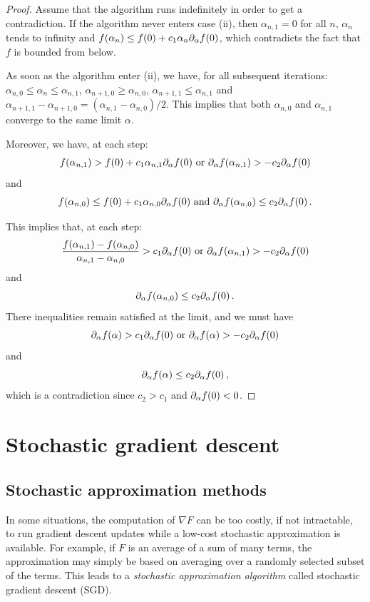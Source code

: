 \begin{proof}
Assume that the algorithm runs indefinitely in order to get a contradiction.
If the algorithm never enters case (ii), then $\alpha_{n,1} = 0$ for all $n$, $\alpha_n$ tends to infinity and $f(\alpha_n) \leq  f(0) + c_1\alpha_n \partial_\alpha f(0)$, which contradicts the fact that $f$ is bounded from below. 

As soon as the algorithm enter (ii), we have, for all subsequent iterations:
$\alpha_{n,0}\leq \alpha_n\leq \alpha_{n,1}$, $\alpha_{n+1, 0}\geq \alpha_{n,0}$, $\alpha_{n+1, 1}\leq \alpha_{n,1}$ and $\alpha_{n+1,1} - \alpha_{n+1,0} = (\alpha_{n,1} - \alpha_{n,0})/2$. This implies that both $\alpha_{n,0}$ and $\alpha_{n,1}$ converge to the same limit $\alpha$.

Moreover, we have, at each step:
\[
f(\alpha_{n,1}) >  f(0) + c_1\alpha_{n,1} \partial_\alpha f(0) \text{ or }
\partial_\alpha f(\alpha_{n,1}) > - c_2 \partial_\alpha f(0)
\]
and
\[
f(\alpha_{n,0}) \leq  f(0) + c_1\alpha_{n,0} \partial_\alpha f(0) \text{ and }
\partial_\alpha f(\alpha_{n,0}) \leq c_2 \partial_\alpha f(0)\,.
\]

This implies that, at each step:
\[
\frac{f(\alpha_{n,1}) - f(\alpha_{n,0})}{\alpha_{n,1} - \alpha_{n,0}} > c_1 \partial_\alpha f(0) \text{ or }
\partial_\alpha f(\alpha_{n,1}) > - c_2 \partial_\alpha f(0)
\]
and
\[
\partial_\alpha f(\alpha_{n,0}) \leq c_2 \partial_\alpha f(0)\,.
\]
There inequalities remain satisfied at the limit, and we must have
\[
\partial_\alpha f(\alpha)  > c_1 \partial_\alpha f(0) \text{ or }
\partial_\alpha f(\alpha) > - c_2 \partial_\alpha f(0)
\]
and
\[
\partial_\alpha f(\alpha) \leq c_2 \partial_\alpha f(0)\,,
\]
which is a contradiction since $c_2>c_1$ and  $\partial_\alpha f(0)<0$.
\end{proof}



\section{Stochastic gradient descent}
\label{sec:sgd}
\subsection{Stochastic approximation methods}
In some situations, the computation of $\nabla F$ can be too costly, if not intractable, to run gradient descent updates while a low-cost stochastic approximation is available. For example, if $F$ is an average of a sum of many terms, the approximation may simply be based on averaging over a randomly selected subset of the terms. This leads to  a {\em stochastic approximation algorithm }\cite{robbins1985stochastic,kushner2003stochastic,benveniste2012adaptive,duflo2013random} called stochastic gradient descent (SGD). 
 
